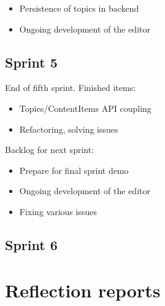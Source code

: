 \documentclass[10pt,a4paper]{article}
\begin{document}
\begin{appendices}
{        \begin{itemize}
          \item Persistence of topics in backend
          \item Ongoing development of the editor
        \end{itemize}

      \subsection*{Sprint 5}
        End of fifth sprint. Finished items:

        \begin{itemize}
          \item Topics/ContentItems API coupling
          \item Refactoring, solving issues
        \end{itemize}

        Backlog for next sprint:

        \begin{itemize}
          \item Prepare for final sprint demo
          \item Ongoing development of the editor
          \item Fixing various issues
        \end{itemize}

      \subsection*{Sprint 6}

    }

    \section{Reflection reports}
  \end{appendices}
\end{document}

